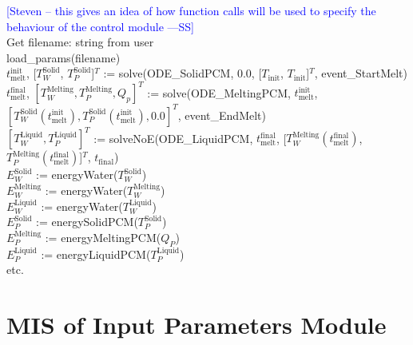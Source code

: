 \documentclass[12pt]{article}
\newcommand{\authornote}[3]{\textcolor{#1}{[#3 ---#2]}}
\newcommand{\authornote}[3]{}
\newcommand{\wss}[1]{\authornote{blue}{SS}{#1}}
\begin{document}
\noindent \wss{Steven -- this gives an idea of how function calls will be used
  to specify the behaviour of the control module}\\

\noindent Get filename: string from user\\

\noindent load\_params(filename)\\

\noindent $t_\text{melt}^\text{init}$, [$T_W^{\text{Solid}}$, $T_P^{\text{Solid}}$]$^T$ := solve(ODE\_SolidPCM, 0.0,
[$T_\text{init}$, $T_\text{init}$]$^T$, event\_StartMelt)\\

\noindent $t_\text{melt}^\text{final}$, $[T_W^{\text{Melting}},
T_P^{\text{Melting}}, Q_p]^T$ := solve(ODE\_MeltingPCM,
$t_\text{melt}^\text{init}$, $[T_W^{\text{Solid}}(t_\text{melt}^\text{init}),
  T_P^{\text{Solid}}(t_\text{melt}^\text{init}), 0.0]^T$,
  event\_EndMelt)\\

\noindent $[ T_W^{\text{Liquid}}, T_P^{\text{Liquid}}]^T$ := solveNoE(ODE\_LiquidPCM, $t_\text{melt}^\text{final}$,
[$T_W^{\text{Melting}}(t_\text{melt}^\text{final})$,
$T_P^{\text{Melting}}(t_\text{melt}^\text{final})$]$^T$, $t_\text{final}$)\\

\noindent $E_W^{\text{Solid}}$ := energyWater($T_W^{\text{Solid}}$)\\

\noindent $E_W^{\text{Melting}}$ := energyWater($T_W^{\text{Melting}}$)\\

\noindent $E_W^{\text{Liquid}}$ := energyWater($T_W^{\text{Liquid}}$)\\

\noindent $E_P^{\text{Solid}}$ := energySolidPCM($T_P^{\text{Solid}}$)\\

\noindent $E_P^{\text{Melting}}$ := energyMeltingPCM($Q_P$)\\

\noindent $E_P^{\text{Liquid}}$ := energyLiquidPCM($T_P^{\text{Liquid}}$)\\

etc.

\newpage
\section{MIS of Input Parameters Module} \label{Parameters}
\end{document}
